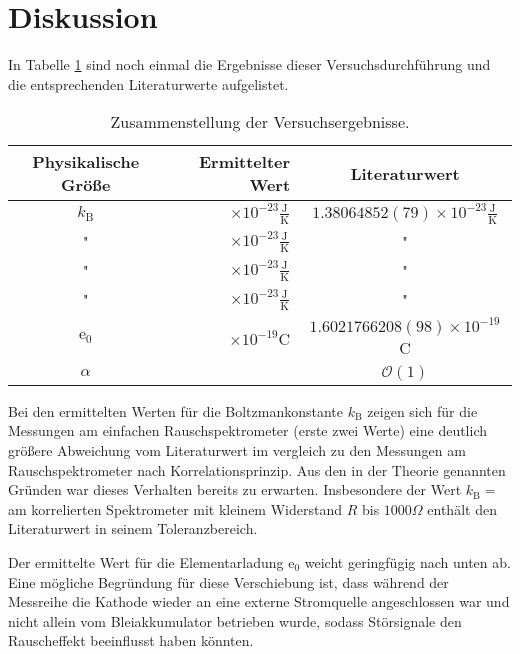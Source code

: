 
\clearpage
\section{Diskussion}
In Tabelle \ref{tab:ergebnisse} sind noch einmal die Ergebnisse 
dieser Versuchsdurchführung und die entsprechenden Literaturwerte 
aufgelistet.

\begin{table}[h]
\centering
\begin{tabular}{crc}
\toprule \midrule
Physikalische Größe & Ermittelter Wert & Literaturwert \\
\midrule
$k_\text{B}$ 	& 
$\times 10^{-23}\frac{\text{J}}{\text{K}}$ & $1.380 648 
52(79)\times 10^{-23}\frac{\text{J}}{\text{K}}$\cite{pdg}		\\
"  				& 
$\times 10^{-23}\frac{\text{J}}{\text{K}}$ & "		\\ 
"  				& 
$\times 10^{-23}\frac{\text{J}}{\text{K}}$ & "		\\
"  				& 
$\times 10^{-23}\frac{\text{J}}{\text{K}}$ & "		\\
$\text{e}_0$		& 
$\times 10^{-19}\text{C}$ & $1.602 176 6208(98)\times 
10^{-19}$C\cite{pdg} \\
$\alpha$			&  
&$\mathcal{O}(1)$\\
\midrule
\bottomrule
\end{tabular}
\caption{Zusammenstellung der Versuchsergebnisse.}
\label{tab:ergebnisse}
\end{table}




Bei den ermittelten Werten für die Boltzmankonstante $k_\text{B}$ 
zeigen sich für die Messungen am einfachen Rauschspektrometer 
(erste zwei Werte) eine deutlich größere Abweichung vom Literaturwert 
im vergleich zu den Messungen am Rauschspektrometer nach 
Korrelationsprinzip. Aus den in der Theorie genannten Gründen 
war dieses Verhalten bereits zu erwarten. Insbesondere der Wert 
$k_\text{B}=$ am korrelierten Spektrometer 
mit kleinem Widerstand $R$ bis $1000\Omega$ enthält den Literaturwert 
in seinem Toleranzbereich. 

Der ermittelte Wert für die Elementarladung $\text{e}_0$ weicht 
geringfügig nach unten ab. Eine mögliche Begründung für diese 
Verschiebung ist, dass während der Messreihe die Kathode wieder 
an eine externe Stromquelle angeschlossen war und nicht allein 
vom Bleiakkumulator betrieben wurde, sodass Störsignale den 
Rauscheffekt beeinflusst haben könnten.

